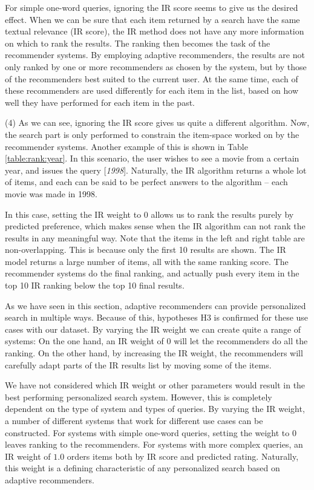 For simple one-word queries, ignoring the IR score seems to give us the desired effect.
When we can be sure that each item returned by a search have the same textual relevance
(IR score), the IR method does not have any more information on which to rank
the results. The ranking then becomes the task of the recommender systems.
By employing adaptive recommenders, the results are not only ranked by 
one or more recommenders as chosen by the system, but by those of the recommenders
best suited to the current user. At the same time, each of these recommenders
are used differently for each item in the list, based on how well they have
performed for each item in the past.

(4) As we can see, ignoring the IR score gives us quite a different algorithm.
Now, the search part is only performed to constrain the item-space worked
on by the recommender systems.
Another example of this is shown in Table \ref{table:rank:year}.
In this scenario, the user wishes to see a movie from a certain year,
and issues the query [\emph{1998}].
Naturally, the IR algorithm returns a whole lot of items, and each can
be said to be perfect answers to the algorithm -- each movie
was made in 1998.

In this case, setting the IR weight to $0$ allows us to rank the results
purely by predicted preference, which makes sense when the IR algorithm
can not rank the results in any meaningful way.
Note that the items in the left and right table are non-overlapping.
This is because only the first 10 results are shown.
The IR model returns a large number of items,
all with the same ranking score.
The recommender systems do the final ranking, and actually
push every item in the top 10 IR ranking 
below the top 10 final results.



As we have seen in this section, adaptive recommenders can provide personalized search
in multiple ways. 
Because of this, hypotheses H3 is confirmed for these use cases with our dataset.
By varying the IR weight we can create quite a range of systems:
On the one hand, an IR weight of 0 will let the recommenders do all the ranking.
On the other hand, by increasing the IR weight, the recommenders will carefully
adapt parts of the IR results list by moving some of the items.



We have not considered which IR weight or other parameters would result in the best performing
personalized search system.
However, this is completely dependent on the type of system and types of queries.
By varying the IR weight, a number of different systems that work for different use cases
can be constructed. For systems with simple one-word queries, setting the weight
to $0$ leaves ranking to the recommenders.
For systems with more complex queries, an IR weight of $1.0$ 
orders items both by IR score and predicted rating.
Naturally, this weight is a defining characteristic of any 
personalized search based on adaptive recommenders.

